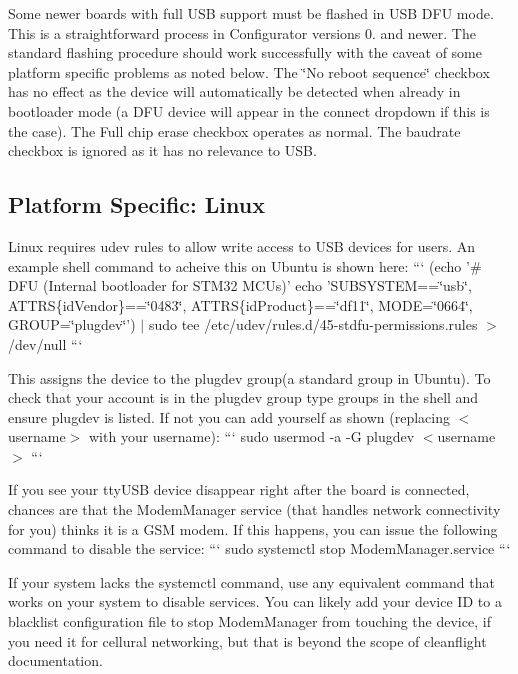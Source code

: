 Some newer boards with full U\+S\+B support must be flashed in U\+S\+B D\+F\+U mode. This is a straightforward process in Configurator versions 0. and newer. The standard flashing procedure should work successfully with the caveat of some platform specific problems as noted below. The \char`\"{}\+No reboot sequence\char`\"{} checkbox has no effect as the device will automatically be detected when already in bootloader mode (a D\+F\+U device will appear in the connect dropdown if this is the case). The Full chip erase checkbox operates as normal. The baudrate checkbox is ignored as it has no relevance to U\+S\+B.

\subsection*{Platform Specific\+: Linux}

Linux requires udev rules to allow write access to U\+S\+B devices for users. An example shell command to acheive this on Ubuntu is shown here\+: ``` (echo '\# D\+F\+U (Internal bootloader for S\+T\+M32 M\+C\+Us)' echo 'S\+U\+B\+S\+Y\+S\+T\+E\+M==\char`\"{}usb\char`\"{}, A\+T\+T\+R\+S\{id\+Vendor\}==\char`\"{}0483\char`\"{}, A\+T\+T\+R\+S\{id\+Product\}==\char`\"{}df11\char`\"{}, M\+O\+D\+E=\char`\"{}0664\char`\"{}, G\+R\+O\+U\+P=\char`\"{}plugdev\char`\"{}') $\vert$ sudo tee /etc/udev/rules.d/45-\/stdfu-\/permissions.\+rules $>$ /dev/null ```

This assigns the device to the plugdev group(a standard group in Ubuntu). To check that your account is in the plugdev group type {\ttfamily groups} in the shell and ensure plugdev is listed. If not you can add yourself as shown (replacing {\ttfamily $<$username$>$} with your username)\+: ``` sudo usermod -\/a -\/\+G plugdev $<$username$>$ ```

If you see your tty\+U\+S\+B device disappear right after the board is connected, chances are that the Modem\+Manager service (that handles network connectivity for you) thinks it is a G\+S\+M modem. If this happens, you can issue the following command to disable the service\+: ``` sudo systemctl stop Modem\+Manager.\+service ```

If your system lacks the systemctl command, use any equivalent command that works on your system to disable services. You can likely add your device I\+D to a blacklist configuration file to stop Modem\+Manager from touching the device, if you need it for cellural networking, but that is beyond the scope of cleanflight documentation.


